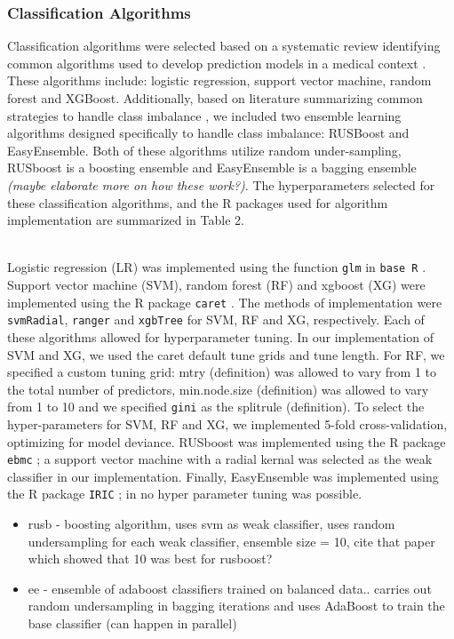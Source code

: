 \documentclass[AMA,STIX1COL,]{WileyNJD-v2}
\providecommand{\tightlist}{%
  \setlength{\itemsep}{0pt}\setlength{\parskip}{0pt}}
\begin{document}
\hypertarget{classification-algorithms}{%
\subsubsection{Classification
Algorithms}\label{classification-algorithms}}

Classification algorithms were selected based on a systematic review
identifying common algorithms used to develop prediction models in a
medical context \citep{constanza}. These algorithms include: logistic
regression, support vector machine, random forest and XGBoost.
Additionally, based on literature summarizing common strategies to
handle class imbalance \citep{yu, summary_m, lp, kaur}, we included two
ensemble learning algorithms designed specifically to handle class
imbalance: RUSBoost and EasyEnsemble. Both of these algorithms utilize
random under-sampling, RUSboost is a boosting ensemble and EasyEnsemble
is a bagging ensemble \emph{(maybe elaborate more on how these work?)}.
The hyperparameters selected for these classification algorithms, and
the R packages used for algorithm implementation are summarized in Table
2.\\
\strut \\
Logistic regression (LR) was implemented using the function \texttt{glm}
in \texttt{base\ R} \citep{r}. Support vector machine (SVM), random
forest (RF) and xgboost (XG) were implemented using the R package
\texttt{caret} \citep{caret}. The methods of implementation were
\texttt{svmRadial}, \texttt{ranger} and \texttt{xgbTree} for SVM, RF and
XG, respectively. Each of these algorithms allowed for hyperparameter
tuning. In our implementation of SVM and XG, we used the caret default
tune grids and tune length. For RF, we specified a custom tuning grid:
mtry (definition) was allowed to vary from 1 to the total number of
predictors, min.node.size (definition) was allowed to vary from 1 to 10
and we specified \texttt{gini} as the splitrule (definition). To select
the hyper-parameters for SVM, RF and XG, we implemented 5-fold
cross-validation, optimizing for model deviance. RUSboost was
implemented using the R package \texttt{ebmc} \citep{ebmc}; a support
vector machine with a radial kernal was selected as the weak classifier
in our implementation. Finally, EasyEnsemble was implemented using the R
package \texttt{IRIC} \citep{iric}; in no hyper parameter tuning was
possible.

\begin{itemize}
\tightlist
\item
  rusb - boosting algorithm, uses svm as weak classifier, uses random
  undersampling for each weak classifier, ensemble size = 10, cite that
  paper which showed that 10 was best for rusboost?
\item
  ee - ensemble of adaboost classifiers trained on balanced data..
  carries out random undersampling in bagging iterations and uses
  AdaBoost to train the base classifier (can happen in parallel)
\end{itemize}
\end{document}
